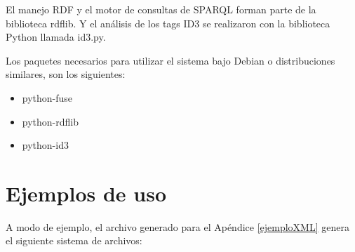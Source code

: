 \documentclass[a4paper,oneside]{report}
\begin{document}
El manejo RDF y el motor de consultas de SPARQL forman parte de la biblioteca rdflib. Y el análisis de los tags ID3 se realizaron con la biblioteca Python llamada id3.py.

Los paquetes necesarios para utilizar el sistema bajo Debian o distribuciones similares, son los siguientes:

\begin{itemize}
 \item python-fuse
 \item python-rdflib
 \item python-id3
\end{itemize}

\chapter{Ejemplos de uso}

A modo de ejemplo, el archivo generado para el Apéndice \ref{ejemploXML} genera el siguiente sistema de archivos:
\end{document}
